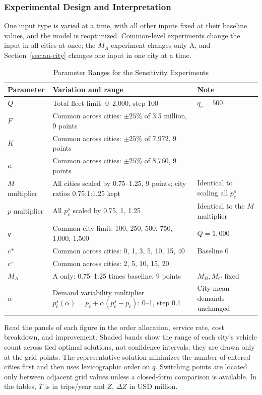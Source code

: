 \documentclass[10pt,a4paper]{article}
\begin{document}
\subsubsection{Experimental Design and Interpretation}
One input type is varied at a time, with all other inputs fixed at their baseline values, and the model is reoptimized.
Common-level experiments change the input in all cities at once; the $M_A$ experiment changes only A, and Section~\ref{sec:an-city} changes one input in one city at a time.
\begin{table}[H]
\centering\small
\caption{Parameter Ranges for the Sensitivity Experiments}\label{tab:an-sens-design}
\begin{tabular}{lP{.50\linewidth}P{.30\linewidth}}
\toprule
Parameter & Variation and range & Note\\\midrule
$Q$ & Total fleet limit: 0--2{,}000, step 100 & $\bar q_c=500$\\
$F$ & Common across cities: $\pm25\%$ of 3.5 million, 9 points & \\
$K$ & Common across cities: $\pm25\%$ of 7{,}972, 9 points & \\
$\kappa$ & Common across cities: $\pm25\%$ of 8{,}760, 9 points & \\
$M$ multiplier & All cities scaled by 0.75--1.25, 9 points; city ratios 0.75:1:1.25 kept & Identical to scaling all $p_c^s$\\
$p$ multiplier & All $p_c^s$ scaled by 0.75, 1, 1.25 & Identical to the $M$ multiplier\\
$\bar q$ & Common city limit: 100, 250, 500, 750, 1{,}000, 1{,}500 & $Q=1{,}000$\\
$c^+$ & Common across cities: 0, 1, 3, 5, 10, 15, 40 & Baseline 0\\
$c^-$ & Common across cities: 2, 5, 10, 15, 20 & \\
$M_A$ & A only: 0.75--1.25 times baseline, 9 points & $M_B,M_C$ fixed\\
$\alpha$ & Demand variability multiplier $p_c^s(\alpha)=\bar p_c+\alpha(p_c^s-\bar p_c)$: 0--1, step 0.1 & City mean demands unchanged\\
\bottomrule
\end{tabular}
\end{table}
Read the panels of each figure in the order allocation, service rate, cost breakdown, and improvement. Shaded bands show the range of each city's vehicle count across tied optimal solutions, not confidence intervals; they are drawn only at the grid points.
The representative solution minimizes the number of entered cities first and then uses lexicographic order on $q$.
Switching points are located only between adjacent grid values unless a closed-form comparison is available. In the tables, $\bar T$ is in trips/year and $Z$, $\Delta Z$ in USD million.
\end{document}
